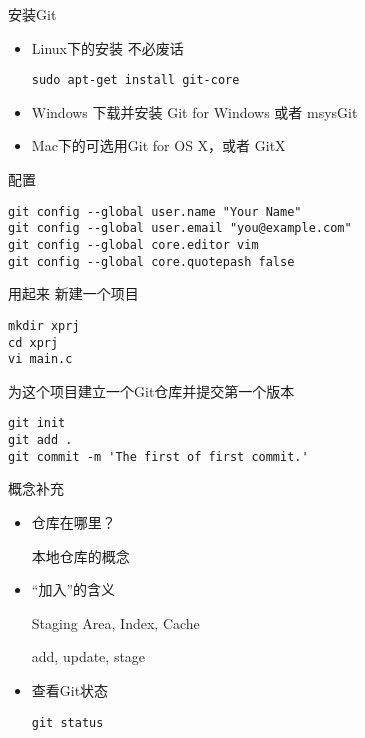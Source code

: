 \begin{frame}[<+->][fragile]{安装Git}
\begin{itemize}
  \item Linux下的安装
  不必废话
\begin{Verbatim}[frame=single,commandchars=\\\{\}]
sudo apt-get install git-core
\end{Verbatim}

  \item Windows 下载并安装 Git for Windows 或者 msysGit

  
  \item Mac下的可选用Git for OS X，或者 GitX
\end{itemize}
\end{frame}

\begin{frame}[<+->][fragile]{配置}
\begin{Verbatim}[frame=single,commandchars=\\\{\}]
git config --global user.name "Your Name"
git config --global user.email "you@example.com"
git config --global core.editor vim
git config --global core.quotepash false
\end{Verbatim}
\end{frame}

\begin{frame}[<+->][fragile]{用起来}
\onslide<+->
新建一个项目
\begin{Verbatim}[frame=single,commandchars=\\\{\}]
mkdir xprj
cd xprj
vi main.c
\end{Verbatim}

\onslide<+->
为这个项目建立一个Git仓库并提交第一个版本
\begin{Verbatim}[frame=single,commandchars=\\\{\}]
git init
git add .
git commit -m 'The first of first commit.'
\end{Verbatim}
\end{frame}

\begin{frame}[<+->][fragile]{概念补充}
  \begin{itemize}
    \item 仓库在哪里？

    本地仓库的概念
    \item “加入”的含义

    Staging Area, Index, Cache 

    add, update, stage
    \item 查看Git状态
\begin{Verbatim}[frame=single,commandchars=\\\{\}]
git status
\end{Verbatim}

  \end{itemize}
\end{frame}


